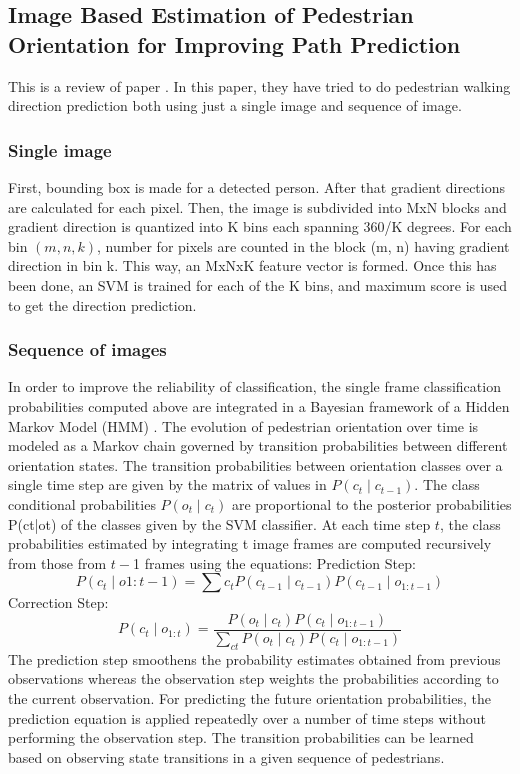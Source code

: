 \documentclass[extendedabs]{bmvc2k}
\begin{document}
\subsection{Image Based Estimation of Pedestrian Orientation for Improving Path
Prediction}
This is a review of paper \cite{4621257}. In this paper, they have tried to do pedestrian walking direction prediction both using just a single
image and sequence of image.

\subsubsection{Single image}
First, bounding box is made for a detected person. After that gradient directions are calculated for each pixel. Then, the image is subdivided into MxN blocks and gradient direction is quantized into K bins each spanning 360/K degrees. For each bin ${(m, n, k)}$, number for pixels are counted in the block (m, n) having gradient direction in bin k. This way, an MxNxK feature vector is formed. 
\newline 
Once this has been done, an SVM is trained for each of the K bins, and maximum score is used to get the direction prediction.

\subsubsection{Sequence of images}
In order to improve the reliability of classification, the single frame classification probabilities computed above are integrated in a Bayesian framework of a Hidden Markov Model (HMM) \cite{rabiner1989tutorial}. The evolution of pedestrian orientation over time is modeled as a Markov chain governed by transition probabilities between different orientation states. The transition probabilities between orientation classes over a single time step are given by the matrix of values in ${P(c_t \mid c_{t-1})}$. The class conditional probabilities ${P(o_t\mid c_t)}$ are proportional to the posterior probabilities P(ct|ot) of the classes given by the SVM classifier. At each time step ${t}$, the class probabilities estimated by integrating t image frames are computed recursively from those from ${t-}$1 frames using the equations: 
\newline
Prediction Step:
\begin{equation}
P(c_t \mid o{1:t-1}) = \sum c_tP(c_{t-1} \mid c_{t-1})P(c_{t-1} \mid o_{1:t-1})
\end{equation}
Correction Step:
\begin{equation}
P(c_t \mid o_{1:t}) = \frac{P(o_t \mid c_t)P(c_t \mid o_{1:t-1})}{\sum_{ct} P(o_t \mid c_t)P(c_t \mid o_{1:t-1})}
\end{equation}
The prediction step smoothens the probability estimates obtained from previous observations whereas the observation step weights the probabilities according to the current observation. For predicting the future orientation probabilities, the prediction equation is applied repeatedly over a number of time steps without performing the observation step. The transition probabilities can be learned based on observing state transitions in a given sequence of pedestrians.
\newline
\end{document}
